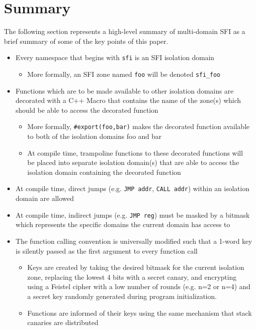 \documentclass[12pt]{article}
\begin{document}
\section{Summary}

The following section represents a high-level summary of multi-domain SFI as a brief summary of some of the key points of this paper.

\begin{itemize}
	\item Every namespace that begins with \texttt{sfi} is an SFI isolation domain
	\begin{itemize}
		\item More formally, an SFI zone named \texttt{foo} will be denoted \texttt{sfi\_foo}
	\end{itemize}
	\item Functions which are to be made available to other isolation domains are decorated with a C++ Macro that contains the name of the zone(s) which should be able to access the decorated function
	\begin{itemize}
		\item More formally, \texttt{\#export(foo,bar)} makes the decorated function available to both of the isolation domains foo and bar
		\item At compile time, trampoline functions to these decorated functions will be placed into separate isolation domain(s) that are able to access the isolation domain containing the decorated function
	\end{itemize}
	\item At compile time, direct jumps (e.g. \texttt{JMP addr}, \texttt{CALL addr}) within an isolation domain are allowed
	\item At compile time, indirect jumps (e.g. \texttt{JMP reg}) must be masked by a bitmask which represents the specific domains the current domain has access to
	\item The function calling convention is universally modified such that a 1-word key is silently passed as the first argument to every function call
	\begin{itemize}
		\item Keys are created by taking the desired bitmask for the current isolation zone, replacing the lowest 4 bits with a secret canary, and encrypting using a Feistel cipher with a low number of rounds (e.g. n=2 or n=4) and a secret key randomly generated during program initialization.
		\item Functions are informed of their keys using the same mechanism that stack canaries are distributed

\end{itemize}
\end{itemize}
\end{document}
